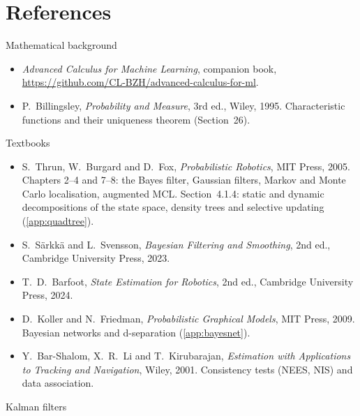 \chapter*{References}

\newcommand{\refgroup}[1]{\par\addvspace{\medskipamount}\noindent#1\par}

\refgroup{Mathematical background}
\begin{itemize}[nosep,leftmargin=1.5em]
\item \emph{Advanced Calculus for Machine Learning}, companion book,
  \url{https://github.com/CL-BZH/advanced-calculus-for-ml}.
\item P.~Billingsley, \emph{Probability and Measure}, 3rd ed., Wiley,
  1995. Characteristic functions and their uniqueness theorem
  (Section~26).
\end{itemize}
\refgroup{Textbooks}
\begin{itemize}[nosep,leftmargin=1.5em]
\item S.~Thrun, W.~Burgard and D.~Fox, \emph{Probabilistic Robotics},
  MIT Press, 2005. Chapters 2--4 and 7--8: the Bayes filter, Gaussian
  filters, Markov and Monte Carlo localisation, augmented MCL.
  Section~4.1.4: static and dynamic decompositions of the state space,
  density trees and selective updating (\cref{app:quadtree}).
\item S.~S\"arkk\"a and L.~Svensson, \emph{Bayesian Filtering and
  Smoothing}, 2nd ed., Cambridge University Press, 2023.
\item T.~D.~Barfoot, \emph{State Estimation for Robotics}, 2nd ed.,
  Cambridge University Press, 2024.
\item D.~Koller and N.~Friedman, \emph{Probabilistic Graphical Models},
  MIT Press, 2009. Bayesian networks and d-separation
  (\cref{app:bayesnet}).
\item Y.~Bar-Shalom, X.~R.~Li and T.~Kirubarajan, \emph{Estimation with
  Applications to Tracking and Navigation}, Wiley, 2001. Consistency
  tests (NEES, NIS) and data association.
\end{itemize}
\refgroup{Kalman filters}
